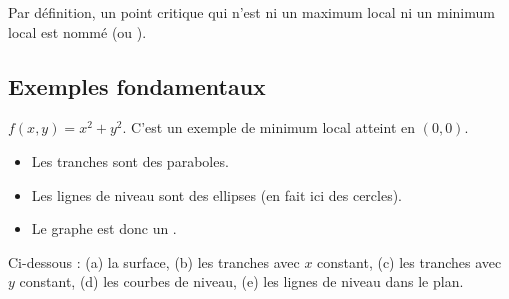 Par définition, un point critique qui n'est ni un maximum local ni un minimum local est nommé  (ou ).

\subsection{Exemples fondamentaux}



\begin{exemple}{}{}
$f(x,y) = x^2 + y^2$. C'est un exemple de minimum local atteint en $(0,0)$.

\begin{itemize}
  \item Les tranches sont des paraboles.
  \item Les lignes de niveau sont des ellipses (en fait ici des cercles).
  \item Le graphe est donc un .
\end{itemize}

Ci-dessous : (a) la surface, (b) les tranches avec $x$ constant, (c) les tranches avec $y$ constant, (d) les courbes de niveau, (e) les lignes de niveau dans le plan.


\end{exemple}
